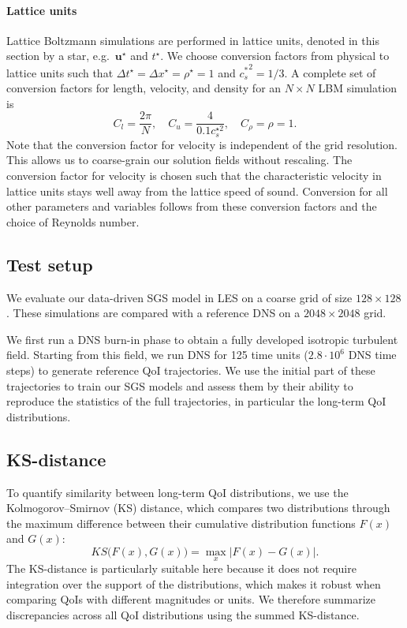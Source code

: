 \documentclass[]{elsarticle}
\begin{document}
\paragraph{Lattice units}
Lattice Boltzmann simulations are performed in lattice units, denoted in this section by a star, e.g.\ $\boldsymbol{u}^\star$ and $t^\star$. We choose conversion factors from physical to lattice units such that $\Delta t^\star = \Delta x^\star = \rho^\star = 1$ and ${c_s^*}^2 = 1/3$. A complete set of conversion factors for length, velocity, and density for an $N \times N$ LBM simulation is
\begin{equation}
    C_l = \frac{2\pi}{N}, \quad C_u=\frac{4}{0.1 c_s^{\star 2}}, \quad C_\rho = \rho = 1.
\end{equation}
Note that the conversion factor for velocity is independent of the grid resolution. This allows us to coarse-grain our solution fields without rescaling. The conversion factor for velocity is chosen such that the characteristic velocity in lattice units stays well away from the lattice speed of sound. Conversion for all other parameters and variables follows from these conversion factors and the choice of Reynolds number.

\subsection{Test setup}
We evaluate our data-driven SGS model in LES on a coarse grid of size $128 \times 128$. These simulations are compared with a reference DNS on a $2048 \times 2048$ grid.

We first run a DNS burn-in phase to obtain a fully developed isotropic turbulent field. Starting from this field, we run DNS for 125 time units ($2.8 \cdot 10^{6}$ DNS time steps) to generate reference QoI trajectories. We use the initial part of these trajectories to train our SGS models and assess them by their ability to reproduce the statistics of the full trajectories, in particular the long-term QoI distributions.

\subsection{KS-distance}
To quantify similarity between long-term QoI distributions, we use the Kolmogorov--Smirnov (KS) distance, which compares two distributions through the maximum difference between their cumulative distribution functions $F(x)$ and $G(x)$:
\begin{equation}
    KS\Big(F(x),G(x)\Big) = \max_x \Big\lvert F(x)-G(x) \Big\rvert.
    \label{eq:KS}
\end{equation}
The KS-distance is particularly suitable here because it does not require integration over the support of the distributions, which makes it robust when comparing QoIs with different magnitudes or units. We therefore summarize discrepancies across all QoI distributions using the summed KS-distance.
\end{document}
